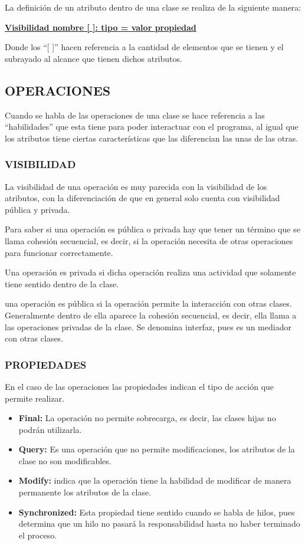 La definición de un atributo dentro de una clase se realiza de la siguiente manera:

\centerline{\textbf{\underline{Visibilidad nombre [ ]: tipo = valor {propiedad}}}}
Donde los “[ ]” hacen referencia a la cantidad de elementos que se tienen y el subrayado al alcance que tienen dichos atributos.



\subsection*{OPERACIONES}
Cuando se habla de las operaciones de una clase se hace referencia a las “habilidades” que esta tiene para poder interactuar con el programa, al igual que los atributos tiene ciertas características que las diferencian las unas de las otras.


\subsubsection*{VISIBILIDAD}
La visibilidad de una operación es muy parecida con la visibilidad de los atributos, con la diferenciación de que en general solo cuenta con visibilidad pública y privada. 

Para saber si una operación es pública o privada hay que tener un término que se llama cohesión secuencial, es decir, si la operación necesita de otras operaciones para funcionar correctamente.

Una operación es privada si dicha operación  realiza una actividad que solamente tiene sentido dentro de la clase.

una operación es pública si la operación permite la interacción con otras clases. Generalmente dentro de ella aparece la cohesión secuencial, es decir, ella llama a las operaciones privadas de la clase. Se denomina interfaz, pues es un mediador con otras clases.


\subsubsection*{PROPIEDADES}
En el caso de las operaciones las propiedades indican el tipo de acción que permite realizar.

\begin{itemize}
	\item{\textbf{Final: }La operación no permite sobrecarga, es decir, las clases hijas no podrán utilizarla.}
	\item{\textbf{Query: }Es una operación que no permite modificaciones, los atributos de la clase no son modificables.}
	\item{\textbf{Modify: }indica que la operación tiene la habilidad de modificar de manera permanente los atributos de la clase.}
	\item{\textbf{Synchronized: }Esta propiedad tiene sentido cuando se habla de hilos, pues determina que un hilo no pasará la responsabilidad hasta no haber terminado el proceso.}
\end{itemize}



